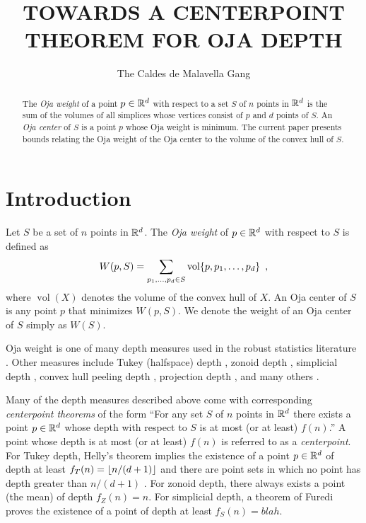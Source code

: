 \documentclass[lotsofwhite]{patmorin}
\title{\MakeUppercase{Towards a Centerpoint Theorem for Oja Depth}}
\author{The Caldes de Malavella Gang}
\date{}
\newcommand{\oja}{W}
\DeclareMathOperator{\vol}{vol}
\begin{document}
\maketitle

\begin{abstract}
The \emph{Oja weight} of a point $p\in\mathbb{R}^d$ with respect to a set $S$
of $n$ points in $\mathbb{R}^d$ is the sum of the volumes of all simplices
whose vertices consist of $p$ and $d$ points of $S$.  An \emph{Oja
center} of $S$ is a point $p$ whose Oja weight is minimum.
The current paper presents bounds relating the Oja weight of the Oja 
center to the volume of the convex hull of $S$.
\end{abstract}


\section{Introduction}

Let $S$ be a set of $n$ points in $\mathbb{R}^d$.  The \emph{Oja weight} of
$p\in\mathbb{R}^d$ with respect to $S$ is defined as
\begin{equation}
     \oja(p,S) = \sum_{p_1,\ldots,p_d\in S}\vol\{p,p_1,\ldots,p_d\}
      \enspace , \eqnlabel{oja}
\end{equation}
where $\vol(X)$ denotes the volume of the convex hull of
$X$.  An Oja center of $S$ is any
point $p$ that minimizes $W(p,S)$.  We denote the weight of an Oja
center of $S$ simply as $W(S)$.

Oja weight is one of many depth measures used in the robust statistics
literature \cite{X,X,X,X}.  Other measures include Tukey (halfspace)
depth \cite{X}, zonoid depth \cite{X}, simplicial depth \cite{X},
convex hull peeling depth \cite{X}, projection depth \cite{X}, and
many others \cite{X}.

Many of the depth measures described above come with corresponding
\emph{centerpoint theorems} of the form ``For any set $S$ of $n$ points
in $\mathbb{R}^d$ there exists a point $p\in\mathbb{R}^d$ whose depth with respect to $S$ is
at most (or at least) $f(n)$.''  A point whose depth is at most (or at
least) $f(n)$ is referred to as a \emph{centerpoint}.  For Tukey
depth, Helly's theorem implies the existence of a point $p\in\mathbb{R}^d$ of
depth at least $f_T(n)=\left\lfloor n/(d+1) \right\rfloor$ and there are point sets in
which no point has depth greater than $n/(d+1)$ \cite{X}.  For zonoid
depth, there always exists a point (the mean) of depth $f_Z(n)=n$.
For simplicial depth, a theorem of Furedi \cite{fXX} proves the
existence of a point of depth at least $f_S(n)=blah$.
\end{document}
